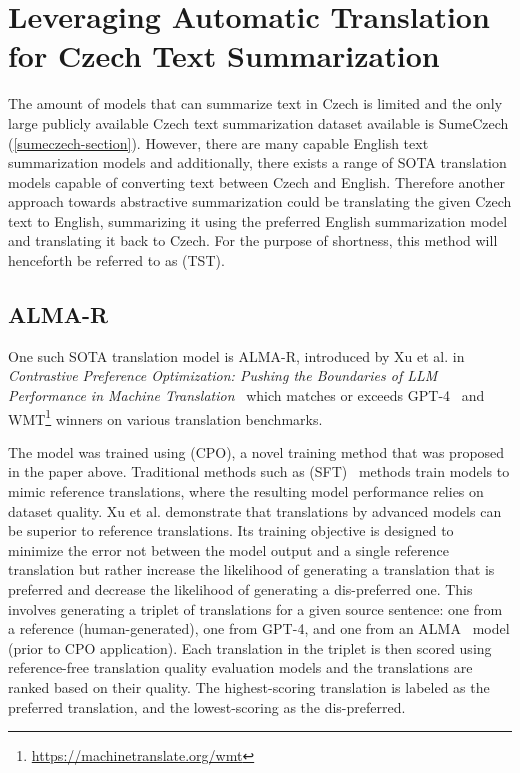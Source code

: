 \documentclass[english, ba, kiv, he, iso690numb, pdf, viewonly]{fasthesis}
\begin{document}
	\section{Leveraging Automatic Translation for Czech Text Summarization}\label{methods:translate}
	The amount of models that can summarize text in Czech is limited and the only large publicly available Czech text summarization dataset available is SumeCzech (\ref{sumeczech-section}). However, there are many capable English text summarization models and additionally, there exists a range of SOTA translation models capable of converting text between Czech and English. Therefore another approach towards abstractive summarization could be translating the given Czech text to English, summarizing it using the preferred English summarization model and translating it back to Czech. For the purpose of shortness, this method will henceforth be referred to as  (TST).
	\subsection{ALMA-R}
	One such SOTA translation model is ALMA-R, introduced by Xu et al. in \textit{Contrastive Preference Optimization: Pushing the Boundaries of LLM Performance in Machine Translation}~\cite{xu2024contrastive} which matches or exceeds GPT-4~\cite{openai2024gpt4} and WMT\footnote{\url{https://machinetranslate.org/wmt}} winners on various translation benchmarks. 
	
	The model was trained using  (CPO), a novel training method that was proposed in the paper above. Traditional methods such as  (SFT)~\cite{goodfellow2016deep} methods train models to mimic reference translations, where the resulting model performance relies on dataset quality. Xu et al. demonstrate that translations by advanced models can be superior to reference translations. Its training objective is designed to minimize the error not between the model output and a single reference translation but rather increase the likelihood of generating a translation that is preferred and decrease the likelihood of generating a dis-preferred one. This involves generating a triplet of translations for a given source sentence: one from a reference (human-generated), one from GPT-4, and one from an ALMA~\cite{xu2024paradigm} model (prior to CPO application). Each translation in the triplet is then scored using reference-free translation quality evaluation models and the translations are ranked based on their quality. The highest-scoring translation is labeled as the preferred translation, and the lowest-scoring as the dis-preferred. 
	
\end{document}
